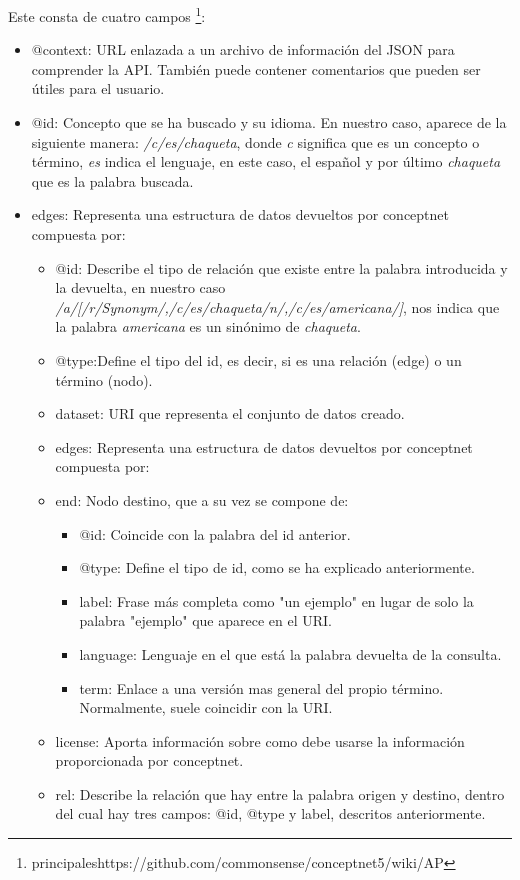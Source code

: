 	
Este consta de cuatro campos \footnote{principaleshttps://github.com/commonsense/conceptnet5/wiki/AP}:
\begin{itemize}
	\item @context:  URL enlazada a un archivo de información del JSON para comprender la API. También puede contener comentarios que pueden ser útiles para el usuario.
	\item @id: Concepto que se ha buscado y su idioma. En nuestro caso, aparece de la siguiente manera: \textit{/c/es/chaqueta}, donde  \textit{c} significa que es un concepto o término,  \textit{es} indica el lenguaje, en este caso, el español y por último \textit{chaqueta} que es la palabra buscada.
	\item edges: Representa una estructura de datos devueltos por conceptnet compuesta por:
	\begin{itemize}
		\item @id: Describe el tipo de relación que existe entre la palabra introducida y la devuelta, en nuestro caso \textit{/a/[/r/Synonym/,/c/es/chaqueta/n/,/c/es/americana/]}, nos indica que la palabra \textit{americana} es un sinónimo de \textit{chaqueta}.
		\item @type:Define el tipo del id, es decir, si es una relación (edge) o un término (nodo).
		\item dataset: URI que representa el conjunto de datos creado.
		\item edges: Representa una estructura de datos devueltos por conceptnet compuesta por:
		\item end: Nodo destino, que a su vez se compone de:	
		\begin{itemize}
			\item @id: Coincide con la palabra del id anterior.
			\item @type: Define el tipo de id, como se ha explicado anteriormente.
			\item label: Frase más completa como "un ejemplo" en lugar de solo la palabra "ejemplo" que aparece en el URI.
			\item language: Lenguaje en el que está la palabra devuelta de la consulta.
			\item term: Enlace a una versión mas general del propio término. Normalmente, suele coincidir con la URI.			
		\end{itemize}
		\item license: Aporta información sobre como debe usarse la información proporcionada por conceptnet.
		\item rel: Describe la relación que hay entre la palabra origen y destino, dentro del cual hay tres campos: @id, @type y label, descritos anteriormente.

\end{itemize}
\end{itemize}

